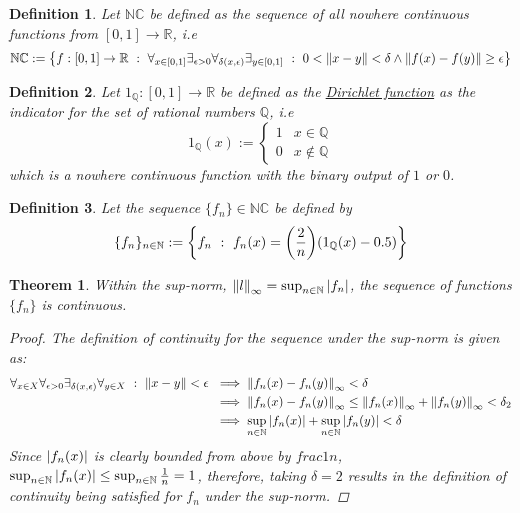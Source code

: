\documentclass[]{article}
\newcommand{\R}{\mathbb{R}}
\newcommand{\N}{\mathbb{N}}
\newcommand{\Q}{\mathbb{Q}}
\newcommand{\st}{\ : \ }
\newtheorem{definition}{Definition}
\newtheorem{theorem}{Theorem}
\begin{document}
\begin{definition}
    Let $\mathbb{NC}$ be defined as the sequence of all nowhere continuous functions from $[0,1] \to \R$, i.e
    \[
        \mathbb{NC} := \qty{
            f : [0,1] \to \R \st \forall_{x \in [0,1]} \exists_{\epsilon>0} \forall_{\delta(x,\epsilon)} \exists_{y \in [0,1]} \st 0 < \norm{x - y} < \delta \land \norm{f(x) - f(y)} \geq \epsilon
        } 
    \]
\end{definition}
\begin{definition}
    Let $1_\Q : [0,1] \to \R$ be defined as the \underline{Dirichlet function} as the indicator for the set of rational numbers $\Q$, i.e
    \[
        1_\Q (x) := 
        \begin{cases}
            1 & x \in \Q\\
            0 & x \notin \Q
        \end{cases}
    \]
    which is a nowhere continuous function with the binary output of $1$ or $0$.
\end{definition}

\begin{definition}
    Let the sequence $\{f_n\} \in \mathbb{NC}$ be defined by
    \[
        \{f_n\}_{n\in\N} := 
        \qty{f_n \st f_n(x) = \qty(\frac{2}{n}) \qty(1_\Q (x) - 0.5)}
    \]
\end{definition}

\begin{theorem}
    Within the sup-norm, $\norm{l}_\infty = \sup_{n\in \N} \abs{f_n}$, the sequence of functions $\{f_n\}$ is continuous.
    \begin{proof}
        The definition of continuity for the sequence under the sup-norm is given as:
        \begin{align*}
            \forall_{x \in X} \forall_{\epsilon > 0} \exists_{\delta(x, \epsilon)} \forall_{y \in X} \st \norm{x - y} < \epsilon \
            &\implies \norm{f_n(x) - f_n(y)}_\infty < \delta\\
            &\implies \norm{f_n(x) - f_n(y)}_\infty \leq \norm{f_n(x)}_\infty + \norm{f_n(y)}_\infty < \delta_2\\
            &\implies \sup_{n\in \N} \abs{f_n(x)} + \sup_{n\in \N} \abs{f_n(y)} < \delta
        \end{align*}
        Since $\abs{f_n(x)}$ is clearly bounded from above by $frac{1}{n}$, 
        $\sup_{n\in \N} \abs{f_n(x)} \leq \sup_{n\in \N} \frac{1}{n} = 1$,
        therefore, taking $\delta = 2$ results in the definition of continuity being satisfied for $f_n$ under the sup-norm.
    \end{proof}
\end{theorem}
\end{document}
